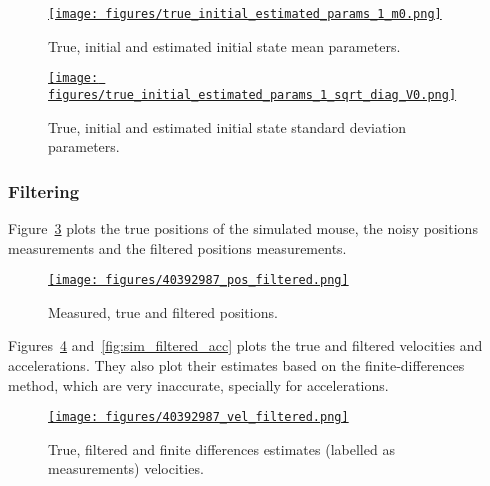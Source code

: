 \documentclass[12pt]{article}
\begin{document}
\begin{figure}
    \centering
    \href{https://www.gatsby.ucl.ac.uk/~rapela/aman/reports/ekfForKinematicsAndHeadOrientation/figures/true_initial_estimated_params_1_m0.png}{\texttt{[image: figures/true\_initial\_estimated\_params\_1\_m0.png]}}

    \caption{True, initial and estimated initial state mean parameters.}

    \label{fig:m0_params}
\end{figure}

\begin{figure}
    \centering
    \href{https://www.gatsby.ucl.ac.uk/~rapela/aman/reports/ekfForKinematicsAndHeadOrientation/figures/true_initial_estimated_params_1_sqrt_diag_V0.png}{\texttt{[image: figures/true\_initial\_estimated\_params\_1\_sqrt\_diag\_V0.png]}}

    \caption{True, initial and estimated initial state standard deviation parameters.}

    \label{fig:sqrt_diag_V0_params}
\end{figure}

\subsubsection*{Filtering}

Figure~\ref{fig:sim_filtered_pos} plots the true positions of the simulated
mouse, the noisy positions measurements and the filtered positions
measurements.

\begin{figure}
    \centering
    \href{https://www.gatsby.ucl.ac.uk/~rapela/aman/reports/ekfForKinematicsAndHeadOrientation/figures/40392987_pos_filtered.html}{\texttt{[image: figures/40392987\_pos\_filtered.png]}}

    \caption{Measured, true and filtered positions.}

    \label{fig:sim_filtered_pos}
\end{figure}

Figures~\ref{fig:sim_filtered_vel} and~\ref{fig:sim_filtered_acc} plots the
true and filtered velocities and accelerations. They also plot their estimates
based on the finite-differences method, which are very inaccurate, specially
for accelerations.

\begin{figure}
    \centering
    \href{https://www.gatsby.ucl.ac.uk/~rapela/aman/reports/ekfForKinematicsAndHeadOrientation/figures/40392987_vel_filtered.html}{\texttt{[image: figures/40392987\_vel\_filtered.png]}}

    \caption{True, filtered and finite differences estimates (labelled as
    measurements) velocities.}

    \label{fig:sim_filtered_vel}
\end{figure}
\end{document}
